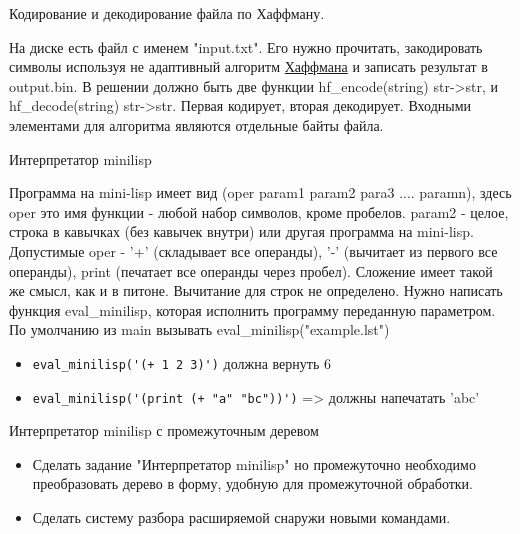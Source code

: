 \documentclass{article}
\begin{document}
\begin{center}Кодирование и декодирование файла по Хаффману.\end{center}
На диске есть файл с именем "input.txt". Его нужно прочитать, закодировать символы 
используя не адаптивный алгоритм 
\href{http://ru.wikipedia.org/wiki/%D0%9A%D0%BE%D0%B4_%D0%A5%D0%B0%D1%84%D1%84%D0%BC%D0%B0%D0%BD%D0%B0}{Хаффмана}  и записать результат в 
output.bin. В решении должно быть две функции 
hf\_encode(string) str->str, и hf\_decode(string) str->str. 
Первая кодирует, вторая декодирует. 
Входными элементами для алгоритма являются отдельные байты файла.
\newpage

\begin{center} Интерпретатор minilisp \end{center}
Программа на mini-lisp имеет вид (oper param1 param2 para3 .... paramn),
здесь oper это имя функции - любой набор символов, кроме пробелов.
param2 - целое, строка в кавычках (без кавычек внутри) или другая программа на mini-lisp.
Допустимые oper - '+' (складывает все операнды), '-' (вычитает из первого все операнды), 
print (печатает все операнды через пробел). Сложение имеет такой же смысл, как и в питоне. 
Вычитание для строк не определено. Нужно написать функция eval\_minilisp, которая 
исполнить программу переданную параметром. 
По умолчанию из main вызывать eval\_minilisp("example.lst")

\begin{itemize}
    \item \lstinline!eval_minilisp('(+ 1 2 3)')! должна вернуть 6
    \item \lstinline!eval_minilisp('(print (+ "a" "bc"))')! => должны напечатать 'abc'
\end{itemize}
\newpage

\begin{center} Интерпретатор minilisp с промежуточным деревом \end{center}
\begin{itemize}
    \item Сделать задание "Интерпретатор minilisp" но промежуточно необходимо преобразовать
        дерево в форму, удобную для промежуточной обработки. 
    \item Сделать систему разбора расширяемой снаружи новыми командами.
\end{itemize}
\newpage
\end{document}
